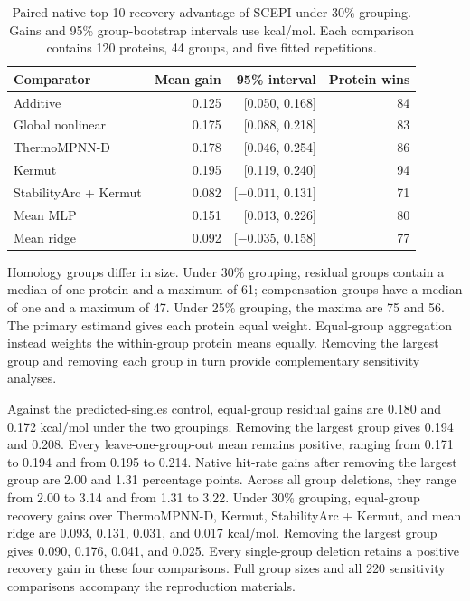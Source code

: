 \documentclass{llncs}
\begin{document}
\begin{table}[H]
\centering
\caption{Paired native top-10 recovery advantage of SCEPI under 30\% grouping. Gains and 95\% group-bootstrap intervals use kcal/mol. Each comparison contains 120 proteins, 44 groups, and five fitted repetitions.}
\label{tab:recoveryuncertainty}
\begin{tabular}{lrrr}
\toprule
Comparator & Mean gain & 95\% interval & Protein wins \\
\midrule
Additive & 0.125 & [0.050, 0.168] & 84 \\
Global nonlinear & 0.175 & [0.088, 0.218] & 83 \\
ThermoMPNN-D & 0.178 & [0.046, 0.254] & 86 \\
Kermut & 0.195 & [0.119, 0.240] & 94 \\
StabilityArc + Kermut & 0.082 & [$-0.011$, 0.131] & 71 \\
Mean MLP & 0.151 & [0.013, 0.226] & 80 \\
Mean ridge & 0.092 & [$-0.035$, 0.158] & 77 \\
\bottomrule
\end{tabular}
\end{table}

Homology groups differ in size. Under 30\% grouping, residual groups contain a median of one protein and a maximum of 61; compensation groups have a median of one and a maximum of 47. Under 25\% grouping, the maxima are 75 and 56. The primary estimand gives each protein equal weight. Equal-group aggregation instead weights the within-group protein means equally. Removing the largest group and removing each group in turn provide complementary sensitivity analyses.

Against the predicted-singles control, equal-group residual gains are 0.180 and 0.172 kcal/mol under the two groupings. Removing the largest group gives 0.194 and 0.208. Every leave-one-group-out mean remains positive, ranging from 0.171 to 0.194 and from 0.195 to 0.214. Native hit-rate gains after removing the largest group are 2.00 and 1.31 percentage points. Across all group deletions, they range from 2.00 to 3.14 and from 1.31 to 3.22. Under 30\% grouping, equal-group recovery gains over ThermoMPNN-D, Kermut, StabilityArc + Kermut, and mean ridge are 0.093, 0.131, 0.031, and 0.017 kcal/mol. Removing the largest group gives 0.090, 0.176, 0.041, and 0.025. Every single-group deletion retains a positive recovery gain in these four comparisons. Full group sizes and all 220 sensitivity comparisons accompany the reproduction materials.
\end{document}
